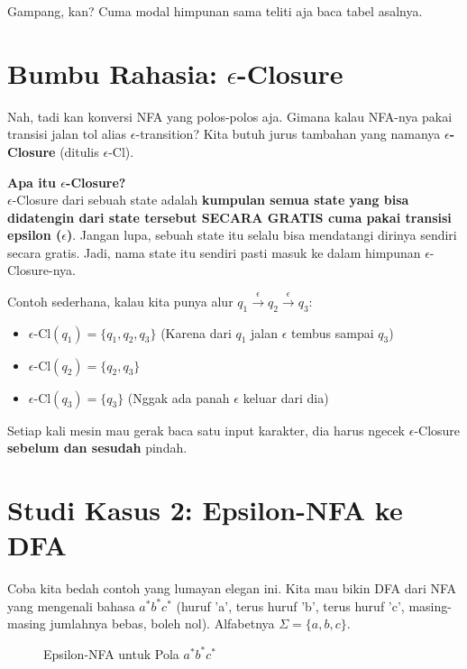 \documentclass[12pt,a4paper]{article}
\begin{document}
Gampang, kan? Cuma modal himpunan sama teliti aja baca tabel asalnya.

\newpage
\section{Bumbu Rahasia: $\epsilon$-Closure}

Nah, tadi kan konversi NFA yang polos-polos aja. Gimana kalau NFA-nya pakai transisi jalan tol alias $\epsilon$-transition? Kita butuh jurus tambahan yang namanya \textbf{$\epsilon$-Closure} (ditulis $\epsilon\text{-Cl}$).

\begin{tipbox}
\textbf{Apa itu $\epsilon$-Closure?} \\
$\epsilon$-Closure dari sebuah state adalah \textbf{kumpulan semua state yang bisa didatengin dari state tersebut SECARA GRATIS cuma pakai transisi epsilon ($\epsilon$)}. Jangan lupa, sebuah state itu selalu bisa mendatangi dirinya sendiri secara gratis. Jadi, nama state itu sendiri pasti masuk ke dalam himpunan $\epsilon$-Closure-nya.
\end{tipbox}

Contoh sederhana, kalau kita punya alur $q_1 \xrightarrow{\epsilon} q_2 \xrightarrow{\epsilon} q_3$:
\begin{itemize}
    \item $\epsilon\text{-Cl}(q_1) = \{q_1, q_2, q_3\}$ (Karena dari $q_1$ jalan $\epsilon$ tembus sampai $q_3$)
    \item $\epsilon\text{-Cl}(q_2) = \{q_2, q_3\}$
    \item $\epsilon\text{-Cl}(q_3) = \{q_3\}$ (Nggak ada panah $\epsilon$ keluar dari dia)
\end{itemize}

Setiap kali mesin mau gerak baca satu input karakter, dia harus ngecek $\epsilon$-Closure \textbf{sebelum dan sesudah} pindah.

\newpage
\section{Studi Kasus 2: Epsilon-NFA ke DFA}

Coba kita bedah contoh yang lumayan elegan ini. Kita mau bikin DFA dari NFA yang mengenali bahasa $a^* b^* c^*$ (huruf 'a', terus huruf 'b', terus huruf 'c', masing-masing jumlahnya bebas, boleh nol). Alfabetnya $\Sigma=\{a,b,c\}$.

\begin{figure}[h]
    \centering
    \caption{Epsilon-NFA untuk Pola $a^*b^*c^*$}
\end{figure}
\end{document}
